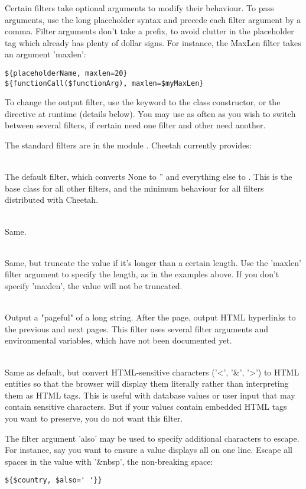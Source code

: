 Certain filters take optional arguments to modify their behaviour.  To pass
arguments, use the long placeholder syntax and precede each filter argument by
a comma.  Filter arguments don't take a \code{\$} prefix, to avoid clutter in
the placeholder tag which already has plenty of dollar signs.  For instance,
the MaxLen filter takes an argument 'maxlen':

\begin{verbatim}
${placeholderName, maxlen=20}
${functionCall($functionArg), maxlen=$myMaxLen}
\end{verbatim}

To change the output filter, use the  keyword to the
 class constructor, or the 
directive at runtime (details below).  You may use  as often as
you wish to switch between several filters, if certain 
need one filter and other  need another.

The standard filters are in the module .  Cheetah
currently provides:

\begin{description}
\item{}
     \\ The default filter, which converts None to '' and everything else to
     .  This is the base class for all other filters,
     and the minimum behaviour for all filters distributed with Cheetah.
\item{}
     \\ Same.
\item{}
     \\ Same, but truncate the value if it's longer than a certain length.
     Use the 'maxlen' filter argument to specify the length, as in the
     examples above.  If you don't specify 'maxlen', the value will not be
     truncated.
\item{}
     \\ Output a "pageful" of a long string.  After the page, output HTML
     hyperlinks to the previous and next pages.  This filter uses several
     filter arguments and environmental variables, which have not been 
     documented yet.
\item{}
     \\ Same as default, but convert HTML-sensitive characters ('<', '\&', '>')
     to HTML entities so that the browser will display them literally rather
     than interpreting them as HTML tags.  This is useful with database values
     or user input that may contain sensitive characters.  But if your values
     contain embedded HTML tags you want to preserve, you do not want this 
     filter.
     
     The filter argument 'also' may be used to specify additional characters to
     escape.  For instance, say you want to ensure a value displays all on one
     line.  Escape all spaces in the value with '\&nbsp', the non-breaking
     space:
\begin{verbatim}
${$country, $also=' '}}
\end{verbatim}
\end{description}

